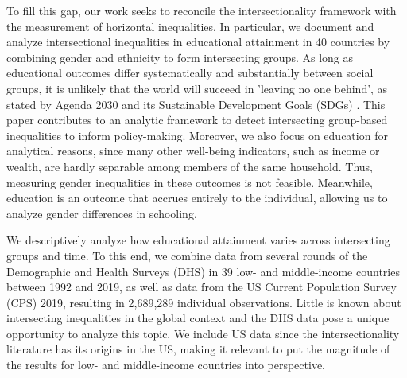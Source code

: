 To fill this gap, our work seeks to reconcile the intersectionality framework with the measurement of horizontal inequalities. In particular, we document and analyze intersectional inequalities in educational attainment in 40 countries by combining gender and ethnicity to form intersecting groups. As long as educational outcomes differ systematically and substantially between social groups, it is unlikely that the world will succeed in 'leaving no one behind', as stated by Agenda 2030 and its Sustainable Development Goals (SDGs) \citep{Stuart2016}. This paper contributes to an analytic framework to detect intersecting group-based inequalities to inform policy-making. Moreover, we also focus on education for analytical reasons, since many other well-being indicators, such as income or wealth, are hardly separable among members of the same household. Thus, measuring gender inequalities in these outcomes is not feasible. Meanwhile, education is an outcome that accrues entirely to the individual, allowing us to analyze gender differences in schooling. 

We descriptively analyze how educational attainment varies across intersecting groups and time. To this end, we combine data from several rounds of the Demographic and Health Surveys (DHS) in 39 low- and middle-income countries between 1992 and 2019, as well as data from the US Current Population Survey (CPS) 2019, resulting in 2,689,289 individual observations. Little is known about intersecting inequalities in the global context and the DHS data pose a unique opportunity to analyze this topic. We include US data since the intersectionality literature has its origins in the US, making it relevant to put the magnitude of the results for low- and middle-income countries into perspective. 

